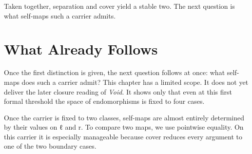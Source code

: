 \documentclass[11pt,a4paper]{book}
\def\texttt#1{#1}%
\begin{document}
Taken together, separation and cover yield a stable two. The next question
is what self-maps such a carrier admits.

\chapter{What Already Follows}
\label{ch:endomorphisms-closure}

Once the first distinction is given, the next question follows at once:
what self-maps does such a carrier admit? This chapter has a limited scope.
It does not yet deliver the later closure reading of \textit{Void}. It shows
only that even at this first formal threshold the space of endomorphisms is
fixed to four cases.

Once the carrier is fixed to two classes, self-maps are almost entirely
determined by their values on \texttt{ℓ} and \texttt{r}. To compare two
maps, we use pointwise equality. On this carrier it is especially
manageable because \texttt{cover} reduces every argument to one of the two
boundary cases.
\end{document}
